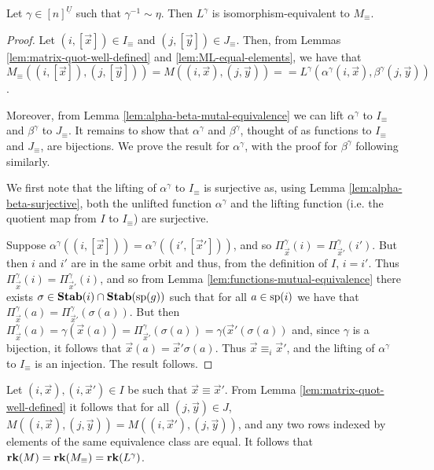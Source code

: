 \documentclass[../paper.tex]{subfiles}
\begin{document}
\begin{thm}
  Let $\gamma \in [n]^{\underline{U}}$ such that $\gamma^{-1} \sim \eta$. Then
  $L^{\gamma}$ is isomorphism-equivalent to $M_{\equiv}$.
  \label{thm:LM-equivalence}
\end{thm}
\begin{proof}
  Let $(i, [\vec{x}]) \in I_\equiv$ and $(j, [\vec{y}]) \in J_\equiv$. Then,
  from Lemmas \ref{lem:matrix-quot-well-defined} and
  \ref{lem:ML-equal-elements}, we have that $M_\equiv ((i, [\vec{x}]), (j,
  [\vec{y}])) = M ((i, \vec{x}), (j, \vec{y}))= = L^{\gamma}(\alpha^{\gamma}(i,
  \vec{x}), \beta^{\gamma}(j, \vec{y}))$.

  Moreover, from Lemma \ref{lem:alpha-beta-mutal-equivalence} we can lift
  $\alpha^\gamma$ to $I_\equiv$ and $\beta^{\gamma}$ to $J_\equiv$. It remains
  to show that $\alpha^\gamma$ and $\beta^{\gamma}$, thought of as functions to
  $I_\equiv$ and $J_\equiv$, are bijections. We prove the result for
  $\alpha^{\gamma}$, with the proof for $\beta^\gamma$ following similarly.

  We first note that the lifting of $\alpha^{\gamma}$ to $I_\equiv$ is
  surjective as, using Lemma \ref{lem:alpha-beta-surjective}, both the unlifted
  function $\alpha^{\gamma}$ and the lifting function (i.e. the quotient map
  from $I$ to $I_\equiv$) are surjective.

  Suppose $\alpha^{\gamma}((i, [\vec{x}])) = \alpha^{\gamma}((i', [\vec{x}']))$,
  and so $\Pi^{\gamma}_{\vec{x}}(i) = \Pi^{\gamma}_{\vec{x}'}(i')$. But then $i$
  and $i'$ are in the same orbit and thus, from the definition of $I$, $i = i'$.
  Thus $\Pi^{\gamma}_{\vec{x}}(i) = \Pi^{\gamma}_{\vec{x}'}(i)$, and so from
  Lemma \ref{lem:functions-mutual-equivalence} there exists $\sigma \in \text{\textbf{Stab}}(i)
  \cap \text{\textbf{Stab}} (\text{sp} (g))$ such that for all $a \in \text{sp}(i)$ we have that
  $\Pi^{\gamma}_{\vec{x}}(a) = \Pi^{\gamma}_{\vec{x}'} (\sigma (a))$. But then
  $\Pi^{\gamma}_{\vec{x}}(a) = \gamma (\vec{x}(a)) =
  \Pi^{\gamma}_{\vec{x}'}(\sigma (a)) = \gamma (\vec{x}' (\sigma (a))$ and,
  since $\gamma$ is a bijection, it follows that $\vec{x}(a) = \vec{x}' \sigma
  (a)$. Thus $\vec{x} \equiv_i \vec{x}'$, and the lifting of $\alpha^{\gamma}$
  to $I_{\equiv}$ is an injection. The result follows.
\end{proof}

Let $(i,\vec{x}), (i, \vec{x}') \in I$ be such that $\vec{x} \equiv \vec{x}'$.
From Lemma \ref{lem:matrix-quot-well-defined} it follows that for all $(j,
\vec{y}) \in J$, $M((i, \vec{x}), (j, \vec{y})) = M((i, \vec{x}'), (j,
\vec{y}))$, and any two rows indexed by elements of the same equivalence class
are equal. It follows that $\text{\textbf{rk}} (M) = \text{\textbf{rk}} (M_{\equiv}) = \text{\textbf{rk}}
(L^{\gamma})$.
\end{document}
